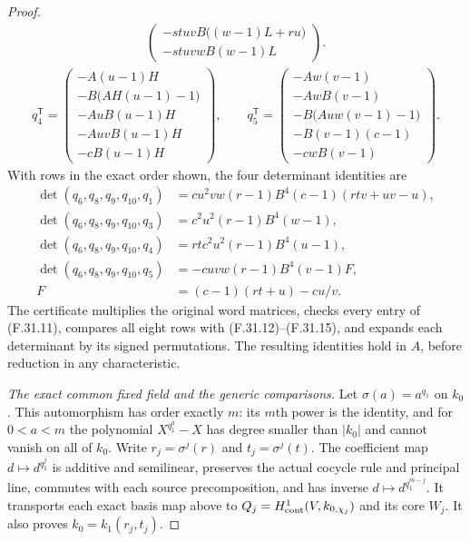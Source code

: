 \begin{proof}
\[\begin{gathered}
\begin{pmatrix}
 -stuvB\bigl((w-1)L+ru\bigr)\\-stuvwB(w-1)L
 \end{pmatrix}.
 \end{gathered}                                                \tag{F.31.14}
\]
\[
 \begin{gathered}
 q_4^{\mathsf T}=
 \begin{pmatrix}
 -A(u-1)H\\-B\bigl(AH(u-1)-1\bigr)\\
 -AuB(u-1)H\\-AuvB(u-1)H\\-cB(u-1)H
 \end{pmatrix},\qquad
 q_5^{\mathsf T}=
 \begin{pmatrix}
 -Aw(v-1)\\-AwB(v-1)\\-B\bigl(Auw(v-1)-1\bigr)\\
 -B(v-1)(c-1)\\-cwB(v-1)
 \end{pmatrix}.
 \end{gathered}                                                \tag{F.31.15}
\]
With rows in the exact order shown, the
four determinant identities are
\[
 \begin{aligned}
 \det(q_6,q_8,q_9,q_{10},q_1)
   &=cu^2vw(r-1)B^4(c-1)(rtv+uv-u),\\
 \det(q_6,q_8,q_9,q_{10},q_3)
   &=c^2u^2(r-1)B^4(w-1),\\
 \det(q_6,q_8,q_9,q_{10},q_4)
   &=rtc^2u^2(r-1)B^4(u-1),\\
 \det(q_6,q_8,q_9,q_{10},q_5)
   &=-cuvw(r-1)B^4(v-1)F,\\
 F&=(c-1)(rt+u)-cu/v.
 \end{aligned}                                                \tag{F.31.16}
\]
The certificate multiplies the original
word matrices, checks every entry of
(F.31.11), compares all eight rows with
(F.31.12)--(F.31.15), and expands each
determinant by its signed permutations.
The resulting identities hold in $A$,
before reduction in any characteristic.

\emph{The exact common fixed field and the generic comparisons.}
Let $\sigma(a)=a^{q_1}$ on $k_0$.
This automorphism has order exactly $m$:
its $m$th power is the identity, and for
$0<a<m$ the polynomial $X^{q_1^a}-X$
has degree smaller than $|k_0|$ and cannot
vanish on all of $k_0$.
Write $r_j=\sigma^j(r)$ and $t_j=\sigma^j(t)$.
The coefficient map $d\mapsto d^{q_1^j}$
is additive and semilinear, preserves the
actual cocycle rule and principal line,
commutes with each source precomposition,
and has inverse $d\mapsto d^{q_1^{m-j}}$.
It transports each exact basis map above
to $Q_j=H^1_{\rm cont}(V,k_{0,\chi_j})$
and its core $W_j$.
It also proves $k_0=k_1(r_j,t_j)$.


\end{proof}

